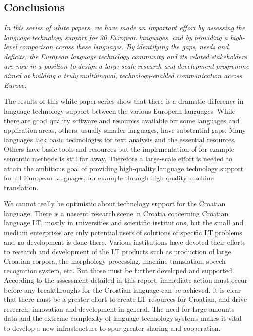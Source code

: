 \begin{multicols}{2}
\subsection{Conclusions}

\emph{In this series of white papers, we have made an important effort by assessing the language technology support for 30 European languages, and by providing a high-level comparison across these languages. By identifying the gaps, needs and deficits, the European language technology community and its related stakeholders are now in a position to design a large scale research and development programme aimed at building a truly multilingual, technology-enabled communication across Europe.}

The results of this white paper series show that there is a dramatic difference in language technology support between the various European languages. While there are good quality software and resources available for some languages and application areas, others, usually smaller languages, have substantial gaps. Many languages lack basic technologies for text analysis and the essential resources. Others have basic tools and resources but the implementation of for example semantic methods is still far away. Therefore a large-scale effort is needed to attain the ambitious goal of providing high-quality language technology support for all European languages, for example through high quality machine translation. 

We cannot really be optimistic about technology support for the Croatian language. There is a nascent research scene in Croatia concerning Croatian language LT, mostly in universities and scientific institutions, but the small and medium enterprises are only potential users of solutions of specific LT problems and no development is done there. Various institutions have devoted their efforts to research and development of the LT products such as production of large Croatian corpora, the morphology processing, machine translation, speech recognition system, etc. But those must be further developed and supported. According to the assessment detailed in this report, immediate action must occur before any breakthroughs for the Croatian language can be achieved. It is clear that there must be a greater effort to create LT resources for Croatian, and drive research, innovation and development in general. The need for large amounts data and the extreme complexity of language technology systems makes it vital to develop a new infrastructure to spur greater sharing and cooperation.


\end{multicols}
